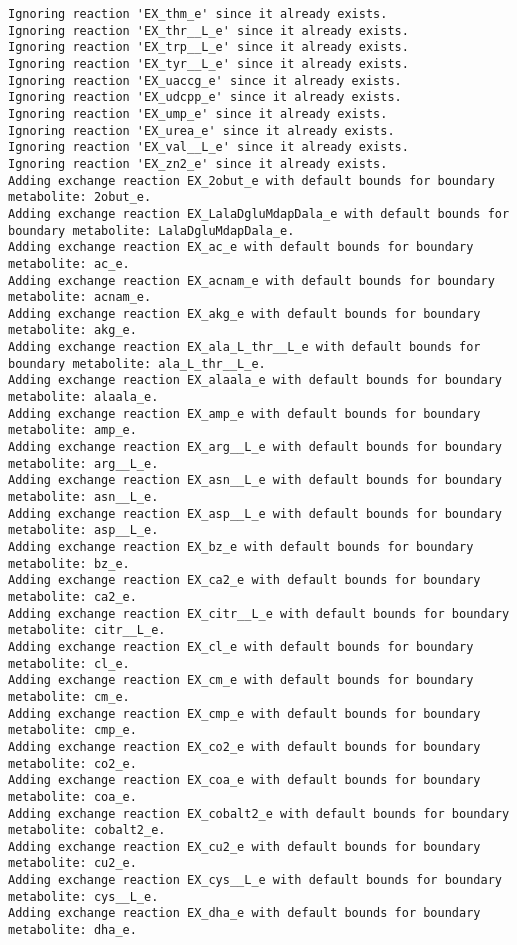 \documentclass[
  letterpaper,
  DIV=11,
  numbers=noendperiod]{scrartcl}
\begin{document}
\begin{verbatim}
Ignoring reaction 'EX_thm_e' since it already exists.
Ignoring reaction 'EX_thr__L_e' since it already exists.
Ignoring reaction 'EX_trp__L_e' since it already exists.
Ignoring reaction 'EX_tyr__L_e' since it already exists.
Ignoring reaction 'EX_uaccg_e' since it already exists.
Ignoring reaction 'EX_udcpp_e' since it already exists.
Ignoring reaction 'EX_ump_e' since it already exists.
Ignoring reaction 'EX_urea_e' since it already exists.
Ignoring reaction 'EX_val__L_e' since it already exists.
Ignoring reaction 'EX_zn2_e' since it already exists.
Adding exchange reaction EX_2obut_e with default bounds for boundary metabolite: 2obut_e.
Adding exchange reaction EX_LalaDgluMdapDala_e with default bounds for boundary metabolite: LalaDgluMdapDala_e.
Adding exchange reaction EX_ac_e with default bounds for boundary metabolite: ac_e.
Adding exchange reaction EX_acnam_e with default bounds for boundary metabolite: acnam_e.
Adding exchange reaction EX_akg_e with default bounds for boundary metabolite: akg_e.
Adding exchange reaction EX_ala_L_thr__L_e with default bounds for boundary metabolite: ala_L_thr__L_e.
Adding exchange reaction EX_alaala_e with default bounds for boundary metabolite: alaala_e.
Adding exchange reaction EX_amp_e with default bounds for boundary metabolite: amp_e.
Adding exchange reaction EX_arg__L_e with default bounds for boundary metabolite: arg__L_e.
Adding exchange reaction EX_asn__L_e with default bounds for boundary metabolite: asn__L_e.
Adding exchange reaction EX_asp__L_e with default bounds for boundary metabolite: asp__L_e.
Adding exchange reaction EX_bz_e with default bounds for boundary metabolite: bz_e.
Adding exchange reaction EX_ca2_e with default bounds for boundary metabolite: ca2_e.
Adding exchange reaction EX_citr__L_e with default bounds for boundary metabolite: citr__L_e.
Adding exchange reaction EX_cl_e with default bounds for boundary metabolite: cl_e.
Adding exchange reaction EX_cm_e with default bounds for boundary metabolite: cm_e.
Adding exchange reaction EX_cmp_e with default bounds for boundary metabolite: cmp_e.
Adding exchange reaction EX_co2_e with default bounds for boundary metabolite: co2_e.
Adding exchange reaction EX_coa_e with default bounds for boundary metabolite: coa_e.
Adding exchange reaction EX_cobalt2_e with default bounds for boundary metabolite: cobalt2_e.
Adding exchange reaction EX_cu2_e with default bounds for boundary metabolite: cu2_e.
Adding exchange reaction EX_cys__L_e with default bounds for boundary metabolite: cys__L_e.
Adding exchange reaction EX_dha_e with default bounds for boundary metabolite: dha_e.

\end{verbatim}
\end{document}
